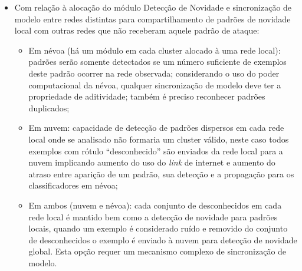 \begin{itemize}
  
  \item Com relação à alocação do módulo Detecção de Novidade e sincronização de
  modelo entre redes distintas para compartilhamento de padrões de novidade local
  com outras redes que não receberam aquele padrão de ataque:
  \begin{itemize}
    
    \item Em névoa (há um módulo em cada cluster alocado à uma rede local): padrões serão
    somente detectados se um número suficiente de exemplos deste padrão ocorrer
    na rede observada; considerando o uso do poder computacional da névoa, qualquer
    sincronização de modelo deve ter a propriedade de aditividade; também é preciso  reconhecer padrões duplicados;

    \item Em nuvem: capacidade de detecção de padrões dispersos em cada rede
    local onde se analisado não formaria um cluster válido,
    neste caso todos exemplos com rótulo ``desconhecido''  são enviados da rede
    local para a nuvem implicando aumento do uso do \emph{link} de internet e
    aumento do atraso entre aparição de um padrão, sua detecção e a propagação
    para os classificadores em névoa;

    \item Em ambos (nuvem e névoa): cada conjunto de desconhecidos em cada rede
    local é mantido bem como a detecção de novidade para padrões locais,
    quando um exemplo é considerado ruído e removido do conjunto de
    desconhecidos o exemplo é enviado à nuvem para detecção de novidade global.
    Esta opção requer um mecanismo complexo de sincronização de modelo.


\end{itemize}
\end{itemize}

